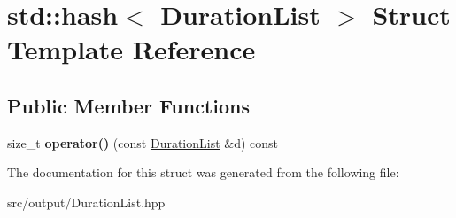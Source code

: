 \hypertarget{structstd_1_1hash_3_01DurationList_01_4}{}\section{std\+::hash$<$ Duration\+List $>$ Struct Template Reference}
\label{structstd_1_1hash_3_01DurationList_01_4}
\subsection*{Public Member Functions}
\begin{DoxyCompactItemize}
\item 
\mbox{\label{structstd_1_1hash_3_01DurationList_01_4_a8f165a7fb48bda9ef5b8d03b08b9b4b3}} 
size\+\_\+t {\bfseries operator()} (const \mbox{\hyperlink{classDurationList}{Duration\+List}} \&d) const
\end{DoxyCompactItemize}


The documentation for this struct was generated from the following file\+:\begin{DoxyCompactItemize}
\item 
src/output/Duration\+List.\+hpp\end{DoxyCompactItemize}
